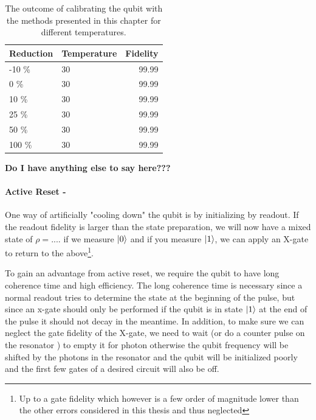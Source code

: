 \begin{table}[h]
\centering
\caption{The outcome of calibrating the qubit with the methods presented in this chapter for different temperatures.}
\begin{tabular}{ll|r}
\hline
\textbf{Reduction}        & Temperature                  & Fidelity\\ \hline
-10 \%                     &  30                         &  99.99\\
0   \%                     &  30                         &  99.99\\
10  \%                     &  30                         &  99.99\\
25  \%                     &  30                         &  99.99\\
50  \%                     &  30                         &  99.99\\
100 \%                     &  30                         &  99.99\\
\end{tabular}
\label{tab:temperature_contribution_estimation}
\end{table}

\textbf{Do I have anything else to say here???} 


\paragraph{Active Reset - } One way of artificially "cooling down" the qubit is by initializing by readout. If the readout fidelity is larger than the state preparation, we will now have a mixed state of $\rho = .... $ if we measure $\ket{0}$ and if you measure $\ket{1}$, we can apply an X-gate to return to the above\footnote{Up to a gate fidelity which however is a few order of magnitude lower than the other errors considered in this thesis and thus neglected}. 

To gain an advantage from active reset, we require the qubit to have long coherence time and high efficiency. The long coherence time is necessary since a normal readout tries to determine the state at the beginning of the pulse, but since an x-gate should only be performed if the qubit is in state $\ket{1}$ at the end of the pulse it should not decay in the meantime. In addition, to make sure we can neglect the gate fidelity of the X-gate, we need to wait (or do a counter pulse on the resonator \cite{}) to empty it for photon otherwise the qubit frequency will be shifted by the photons in the resonator and the qubit will be initialized poorly and the first few gates of a desired circuit will also be off. 

